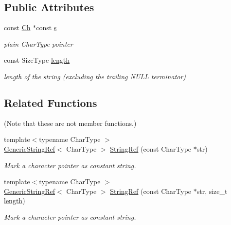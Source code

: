 \subsection*{Public Attributes}
\begin{DoxyCompactItemize}
\item 
const \hyperlink{struct_generic_string_ref_a16908c3fce41be380061330c14ba2140}{Ch} $\ast$const \hyperlink{struct_generic_string_ref_aec7a5900ea6f3e42f0ea8403d5135103}{s}\hypertarget{struct_generic_string_ref_aec7a5900ea6f3e42f0ea8403d5135103}{}\label{struct_generic_string_ref_aec7a5900ea6f3e42f0ea8403d5135103}

\begin{DoxyCompactList}\small\item\em plain Char\+Type pointer \end{DoxyCompactList}\item 
const Size\+Type \hyperlink{struct_generic_string_ref_a4a96d618744ad73f766a1551b1d517fe}{length}\hypertarget{struct_generic_string_ref_a4a96d618744ad73f766a1551b1d517fe}{}\label{struct_generic_string_ref_a4a96d618744ad73f766a1551b1d517fe}

\begin{DoxyCompactList}\small\item\em length of the string (excluding the trailing N\+U\+LL terminator) \end{DoxyCompactList}\end{DoxyCompactItemize}
\subsection*{Related Functions}
(Note that these are not member functions.) \begin{DoxyCompactItemize}
\item 
{\footnotesize template$<$typename Char\+Type $>$ }\\\hyperlink{struct_generic_string_ref}{Generic\+String\+Ref}$<$ Char\+Type $>$ \hyperlink{struct_generic_string_ref_aa6b9fd9f6aa49405a574c362ba9af6b5}{String\+Ref} (const Char\+Type $\ast$str)
\begin{DoxyCompactList}\small\item\em Mark a character pointer as constant string. \end{DoxyCompactList}\item 
{\footnotesize template$<$typename Char\+Type $>$ }\\\hyperlink{struct_generic_string_ref}{Generic\+String\+Ref}$<$ Char\+Type $>$ \hyperlink{struct_generic_string_ref_a578c51ab574a50a9c760b9da7c7562f2}{String\+Ref} (const Char\+Type $\ast$str, size\+\_\+t \hyperlink{struct_generic_string_ref_a4a96d618744ad73f766a1551b1d517fe}{length})
\begin{DoxyCompactList}\small\item\em Mark a character pointer as constant string. \end{DoxyCompactList}\end{DoxyCompactItemize}


